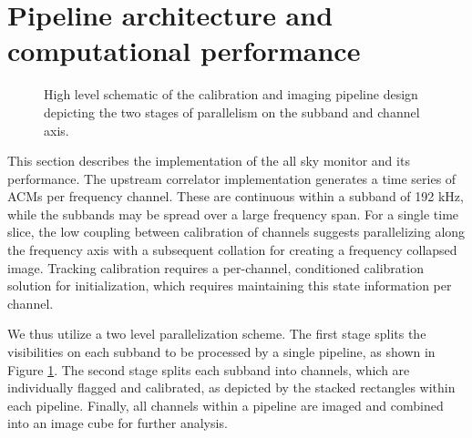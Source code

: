 \documentclass{aa}
\begin{document}
\section{\label{sec:Computational-performance}Pipeline architecture and computational performance}
\begin{figure}[tbh]
\caption{\label{fig:pipeline}  High  level  schematic  of  the  calibration  and
  imaging pipeline design depicting the two stages of parallelism on the subband
  and channel axis.}
\end{figure}

This  section  describes the  implementation  of the  all  sky  monitor and  its
performance. The  upstream correlator implementation generates a  time series of
ACMs per  frequency channel. These are  continuous within a subband  of 192 kHz,
while  the subbands may  be spread  over a  large frequency  span. For  a single
time slice,   the  low   coupling  between   calibration  of   channels  suggests
parallelizing along the frequency axis with a subsequent collation for creating
a  frequency  collapsed image.   Tracking  calibration  requires a  per-channel,
conditioned calibration solution  for initialization, which requires maintaining
this state information per channel. 

We thus utilize  a two level parallelization scheme. The  first stage splits the
visibilities on each  subband to be processed by a single  pipeline, as shown in
Figure \ref{fig:pipeline}.   The second stage splits each  subband into channels,
which  are  individually  flagged   and  calibrated,  as depicted  by  the  stacked
rectangles within  each pipeline.  Finally,  all channels within a  pipeline are
imaged and combined into an image cube for further analysis.
\end{document}
